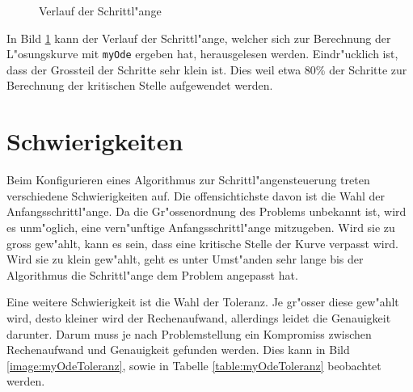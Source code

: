 \begin{refsection}
\begin{figure}
\caption{Verlauf der Schrittl"ange}
\label{image:verlaufSchrittlaenge}
\end{figure}
In Bild \ref{image:verlaufSchrittlaenge} kann der Verlauf der Schrittl"ange, welcher sich zur Berechnung der L"osungskurve mit \texttt{myOde} ergeben hat, herausgelesen werden.
Eindr"ucklich ist, dass der Grossteil der Schritte sehr klein ist.
Dies weil etwa 80\% der Schritte zur Berechnung der kritischen Stelle aufgewendet werden.

\section{Schwierigkeiten}

Beim Konfigurieren eines Algorithmus zur Schrittl"angensteuerung treten verschiedene Schwierigkeiten auf.
Die offensichtichste davon ist die Wahl der Anfangsschrittl"ange.
Da die Gr"ossenordnung des Problems unbekannt ist, wird es unm"oglich, eine vern"unftige Anfangsschrittl"ange mitzugeben.
Wird sie zu gross gew"ahlt, kann es sein, dass eine kritische Stelle der Kurve verpasst wird.
Wird sie zu klein gew"ahlt, geht es unter Umst"anden sehr lange bis der Algorithmus die Schrittl"ange dem Problem angepasst hat.

Eine weitere Schwierigkeit ist die Wahl der Toleranz.
Je gr"osser diese gew"ahlt wird, desto kleiner wird der Rechenaufwand, allerdings leidet die Genauigkeit darunter.
Darum muss je nach Problemstellung ein Kompromiss zwischen Rechenaufwand und Genauigkeit gefunden werden.
Dies kann in Bild \ref{image:myOdeToleranz}, sowie in Tabelle \ref{table:myOdeToleranz} beobachtet werden.


\end{refsection}
